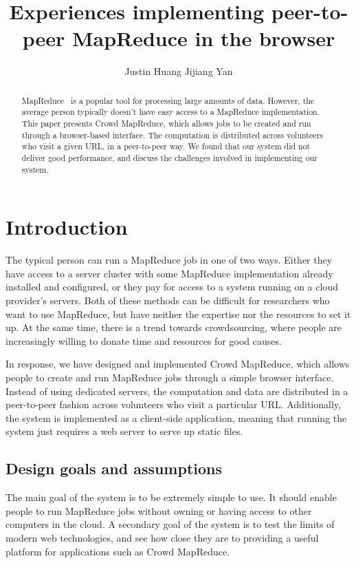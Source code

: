 \documentclass{article} %
\title{Experiences implementing peer-to-peer MapReduce in the browser}
\author{Justin Huang \And Jijiang Yan}
\begin{document}
\maketitle

\begin{abstract}
MapReduce~\cite{dean2008mapreduce} is a popular tool for processing large
amounts of data. However, the average person typically doesn't have easy access
to a MapReduce implementation. This paper presents Crowd MapReduce, which allows
jobs to be created and run through a browser-based interface. The computation is
distributed across volunteers who visit a given URL, in a peer-to-peer way. We
found that our system did not deliver good performance, and discuss the
challenges involved in implementing our system.
\end{abstract}

\section{Introduction}
The typical person can run a MapReduce job in one of two ways. Either they have
access to a server cluster with some MapReduce implementation already installed
and configured, or they pay for access to a system running on a cloud provider's
servers. Both of these methods can be difficult for researchers who want to use
MapReduce, but have neither the expertise nor the resources to set it up. At the
same time, there is a trend towards crowdsourcing, where people are
increasingly willing to donate time and resources for good causes.

In response, we have designed and implemented Crowd MapReduce, which allows
people to create and run MapReduce jobs through a simple browser interface.
Instead of using dedicated servers, the computation and data are distributed in
a peer-to-peer fashion across volunteers who visit a particular URL.
Additionally, the system is implemented as a client-side application, meaning
that running the system just requires a web server to serve up static files.

\subsection{Design goals and assumptions}
The main goal of the system is to be extremely simple to use. It should enable
people to run MapReduce jobs without owning or having access to other computers
in the cloud. A secondary goal of the system is to test the limits of modern web
technologies, and see how close they are to providing a useful platform for
applications such as Crowd MapReduce.
\end{document}
